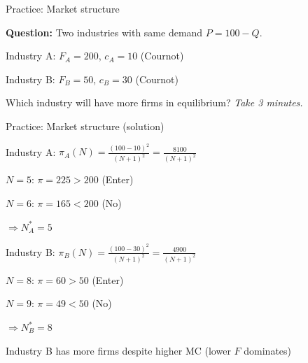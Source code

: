 \documentclass[notes,11pt, aspectratio=169]{beamer}
\newenvironment{wideitemize}{\itemize\addtolength{\itemsep}{10pt}}{\enditemize}
\begin{document}
\begin{frame}{Practice: Market structure}
	\begin{wideitemize}
		\item \textbf{Question:} Two industries with same demand $P = 100 - Q$.
		\item Industry A: $F_A = 200$, $c_A = 10$ (Cournot)
		\item Industry B: $F_B = 50$, $c_B = 30$ (Cournot)
		\item Which industry will have more firms in equilibrium?
	\end{wideitemize}
	\vspace{10pt}
	\centering
	\textit{Take 3 minutes.}
\end{frame}

\begin{frame}{Practice: Market structure (solution)}
	\begin{wideitemize}
		\item Industry A: $\pi_A(N) = \frac{(100-10)^2}{(N+1)^2} = \frac{8100}{(N+1)^2}$
		\begin{wideitemize}
			\vspace{3pt}
			\item $N=5$: $\pi = 225 > 200$ (Enter)
			\item $N=6$: $\pi = 165 < 200$ (No)
			\item $\Rightarrow N^*_A = 5$
		\end{wideitemize}
		\item Industry B: $\pi_B(N) = \frac{(100-30)^2}{(N+1)^2} = \frac{4900}{(N+1)^2}$
		\begin{wideitemize}
			\vspace{3pt}
			\item $N=8$: $\pi = 60 > 50$ (Enter)
			\item $N=9$: $\pi = 49 < 50$ (No)
			\item $\Rightarrow N^*_B = 8$
		\end{wideitemize}
		\item Industry B has more firms despite higher MC (lower $F$ dominates)
	\end{wideitemize}
\end{frame}
\end{document}
